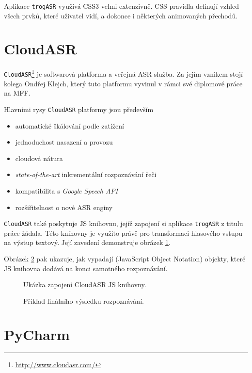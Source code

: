 Aplikace \verb|trogASR| využívá CSS3 velmi extenzivně. CSS pravidla definují vzhled všech prvků, které uživatel vidí, a dokonce i některých animovaných přechodů.

\section{CloudASR}

\verb|CloudASR|\footnote{\url{http://www.cloudasr.com/}} je softwarová platforma a veřejná ASR služba. Za jejím vznikem stojí kolega Ondřej Klejch, který tuto platformu vyvinul v rámci své diplomové práce na MFF.

Hlavními rysy \verb|CloudASR| platformy jsou především 

\begin{itemize}
\item automatické škálování podle zatížení
\item jednoduchost nasazení a provozu
\item cloudová nátura
\item {\sl state-of-the-art} inkrementální rozpoznávání řeči
\item kompatibilita s {\sl Google Speech API}
\item rozšiřitelnost o nové ASR enginy
\end{itemize}

\verb|CloudASR| také poskytuje JS knihovnu, jejíž zapojení si aplikace \verb|trogASR| z titulu práce žádala. Této knihovny je využito právě pro transformaci hlasového vstupu na výstup textový. Její zavedení demonstruje obrázek \ref{fig:cloudasr}.

Obrázek \ref{fig:cloudasr_final} pak ukazuje, jak vypadají  (JavaScript Object Notation) objekty, které JS knihovna dodává na konci samotného rozpoznávání.
\\
\begin{figure}[h]
	
	\caption{Ukázka zapojení CloudASR JS knihovny.}
	\label{fig:cloudasr}
\end{figure}

\begin{figure}[h]
	
	\caption{Příklad finálního výsledku rozpoznávání.}
	\label{fig:cloudasr_final}
\end{figure}

\section{PyCharm}

